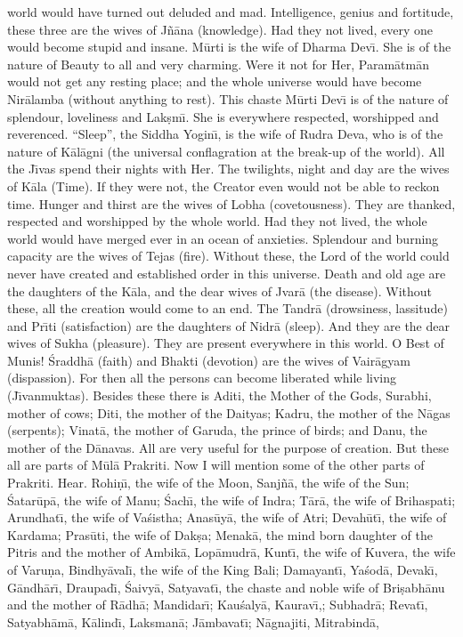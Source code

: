 world would have turned out deluded and mad. Intelligence, genius and fortitude, these three are the wives of J\~n\=ana (knowledge). Had they not lived, every one would become stupid and insane. M\=urti is the wife of Dharma Dev\={\i}. She is of the nature of Beauty to all and very charming. Were it not for Her, Param\=atm\=an would not get any resting place; and the whole universe would have become Nir\=alamba (without anything to rest). This chaste M\=urti Dev\={\i} is of the nature of splendour, loveliness and Lak\d{s}m\={\i}. She is everywhere respected, worshipped and reverenced. ``Sleep'', the Siddha Yogin\={\i}, is the wife of Rudra Deva, who is of the nature of K\=al\=agni (the universal conflagration at the break-up of the world). All the J\={\i}vas spend their nights with Her. The twilights, night and day are the wives of K\=ala (Time). If they were not, the Creator even would not be able to reckon time. Hunger and thirst are the wives of Lobha (covetousness). They are thanked, respected and worshipped by the whole world. Had they not lived, the whole world would have merged ever in an ocean of anxieties. Splendour and burning capacity are the wives of Tejas (fire). Without these, the Lord of the world could never have created and established order in this universe. Death and old age are the daughters of the K\=ala, and the dear wives of Jvar\=a (the disease). Without these, all the creation would come to an end. The Tandr\=a (drowsiness, lassitude) and Pr\={\i}ti (satisfaction) are the daughters of Nidr\=a (sleep). And they are the dear wives of Sukha (pleasure). They are present everywhere in this world. O Best of Munis! \'Sraddh\=a (faith) and Bhakti (devotion) are the wives of Vair\=agyam (dispassion). For then all the persons can become liberated while living (J\={\i}vanmuktas). Besides these there is Aditi, the Mother of the Gods, Surabhi, mother of cows; Diti, the mother of the Daityas; Kadru, the mother of the N\=agas (serpents); Vinat\=a, the mother of Garuda, the prince of birds; and Danu, the mother of the D\=anavas. All are very useful for the purpose of creation. But these all are parts of M\=ul\=a Prakriti. Now I will mention some of the other parts of Prakriti. Hear. Rohi\d{n}\={\i}, the wife of the Moon, Sanj\~n\=a, the wife of the Sun; \'Satar\=up\=a, the wife of Manu; \'Sach\={\i}, the wife of Indra; T\=ar\=a, the wife of Brihaspati; Arundhat\={\i}, the wife of Va\'sistha; Anas\=uy\=a, the wife of Atri; Devah\=ut\={\i}, the wife of Kardama; Pras\=uti, the wife of Dak\d{s}a; Menak\=a, the mind born daughter of the Pitris and the mother of Ambik\=a, Lop\=amudr\=a, Kunt\={\i}, the wife of Kuvera, the wife of Varu\d{n}a, Bindhy\=aval\={\i}, the wife of the King Bali; Damayant\={\i}, Ya\'sod\=a, Devak\={\i}, G\=andh\=ar\={\i}, Draupad\={\i}, \'Saivy\=a, Satyavat\={\i}, the chaste and noble wife of Bri\d{s}abh\=anu and the mother of R\=adh\=a; Mandidar\={\i}; Kau\'saly\=a, Kaurav\={\i},; Subhadr\=a; Revat\={\i}, Satyabh\=am\=a, K\=alind\={\i}, Laksman\=a; J\=ambavat\={\i}; N\=agnajiti, Mitrabind\=a,

